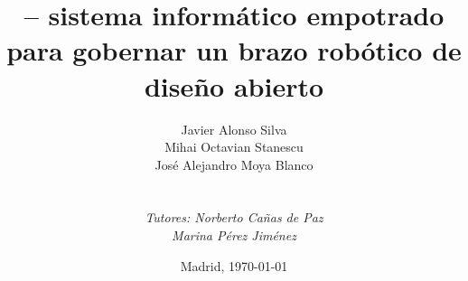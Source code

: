 
\def\Company{Consultancy}
\def\Institute{\textit{Universidad Politécnica de Madrid}\\ \textit{Escuela Técnica Superior de Ingeniería de Sistemas Informáticos}}
\def\Course{\textit{Grado en Ingeniería de Computadores}}
\def\Module{\textit{Trabajo de Fin de Grado}}
\def\Docent{\textit{Tutores: Norberto Cañas de Paz} \\ \textit{Marina Pérez Jiménez}}
\def\Assistant{}


\def\Subtitle{\pArm{} -- sistema informático empotrado para gobernar un brazo robótico de diseño abierto}
\def\Authors{Javier Alonso Silva \\ Mihai Octavian Stanescu \\ José Alejandro Moya Blanco } 
\def\Shortname{J. Alonso, M. Stanescu, A. Moya}


\title{\Subtitle}
\author{\Authors \\ \\ \\ \Docent}
\date{Madrid, \today{}}

